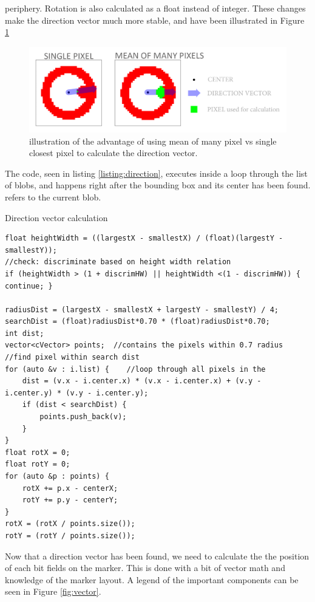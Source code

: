periphery. Rotation is also calculated as a float instead of integer. These changes make the direction vector much more stable, and have been illustrated in Figure \ref{fig:lowpixel}
\begin{figure}
	\centering
	\includegraphics[width=1\linewidth]{figure/Analysis/lowpixel.png}
	\caption{illustration of the advantage of using mean of many pixel vs single closest pixel to calculate the direction vector.} 
	\label{fig:lowpixel}
\end{figure}
 The code, seen in listing \ref{listing:direction}, executes inside a loop through the list of blobs, and happens right after the bounding box and its center has been found.  refers to the current blob.
\begin{listing}[H]
	\caption{Direction vector calculation}
	\begin{verbatim}
float heightWidth = ((largestX - smallestX) / (float)(largestY - smallestY));
//check: discriminate based on height width relation
if (heightWidth > (1 + discrimHW) || heightWidth <(1 - discrimHW)) { continue; }	

radiusDist = (largestX - smallestX + largestY - smallestY) / 4;
searchDist = (float)radiusDist*0.70 * (float)radiusDist*0.70;
int dist;
vector<cVector> points;  //contains the pixels within 0.7 radius
//find pixel within search dist
for (auto &v : i.list) {	//loop through all pixels in the
	dist = (v.x - i.center.x) * (v.x - i.center.x) + (v.y - i.center.y) * (v.y - i.center.y);
	if (dist < searchDist) {
		points.push_back(v);
	}
}
float rotX = 0;
float rotY = 0;
for (auto &p : points) {
	rotX += p.x - centerX;
	rotY += p.y - centerY;
}
rotX = (rotX / points.size());
rotY = (rotY / points.size());
	\end{verbatim}
	\label{listing:direction}
\end{listing}
Now that a direction vector has been found, we need to calculate the the position of each bit fields on the marker. This is done with a bit of vector math and knowledge of the marker layout. A legend of the important components can be seen in Figure \ref{fig:vector}.
